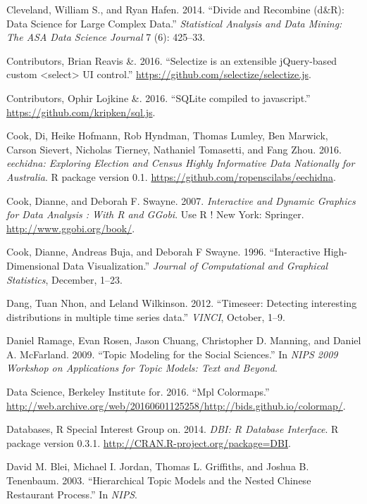 \documentclass[12pt,]{isuthesis}
\begin{document}
\hypertarget{ref-divide-recombine}{}
Cleveland, William S., and Ryan Hafen. 2014. ``Divide and Recombine
(d\&R): Data Science for Large Complex Data.'' \emph{Statistical
Analysis and Data Mining: The ASA Data Science Journal} 7 (6): 425--33.

\hypertarget{ref-selectizejs}{}
Contributors, Brian Reavis \&. 2016. ``Selectize is an extensible
jQuery-based custom \textless{}select\textgreater{} UI control.''
\url{https://github.com/selectize/selectize.js}.

\hypertarget{ref-SQLjs}{}
Contributors, Ophir Lojkine \&. 2016. ``SQLite compiled to javascript.''
\url{https://github.com/kripken/sql.js}.

\hypertarget{ref-eechidna}{}
Cook, Di, Heike Hofmann, Rob Hyndman, Thomas Lumley, Ben Marwick, Carson
Sievert, Nicholas Tierney, Nathaniel Tomasetti, and Fang Zhou. 2016.
\emph{eechidna: Exploring Election and Census Highly Informative Data
Nationally for Australia}. R package version 0.1.
\url{https://github.com/ropenscilabs/eechidna}.

\hypertarget{ref-ggobi:2007}{}
Cook, Dianne, and Deborah F. Swayne. 2007. \emph{Interactive and Dynamic
Graphics for Data Analysis : With R and GGobi}. Use R ! New York:
Springer. \url{http://www.ggobi.org/book/}.

\hypertarget{ref-Cook:2007uk}{}
Cook, Dianne, Andreas Buja, and Deborah F Swayne. 1996. ``Interactive
High-Dimensional Data Visualization.'' \emph{Journal of Computational
and Graphical Statistics}, December, 1--23.

\hypertarget{ref-Wilkinson:2012}{}
Dang, Tuan Nhon, and Leland Wilkinson. 2012. ``Timeseer: Detecting
interesting distributions in multiple time series data.'' \emph{VINCI},
October, 1--9.

\hypertarget{ref-Ramage}{}
Daniel Ramage, Evan Rosen, Jason Chuang, Christopher D. Manning, and
Daniel A. McFarland. 2009. ``Topic Modeling for the Social Sciences.''
In \emph{NIPS 2009 Workshop on Applications for Topic Models: Text and
Beyond}.

\hypertarget{ref-viridis}{}
Data Science, Berkeley Institute for. 2016. ``Mpl Colormaps.''
\url{http://web.archive.org/web/20160601125258/http://bids.github.io/colormap/}.

\hypertarget{ref-DBI}{}
Databases, R Special Interest Group on. 2014. \emph{DBI: R Database
Interface}. R package version 0.3.1.
\url{http://CRAN.R-project.org/package=DBI}.

\hypertarget{ref-Blei-hierarchical}{}
David M. Blei, Michael I. Jordan, Thomas L. Griffiths, and Joshua B.
Tenenbaum. 2003. ``Hierarchical Topic Models and the Nested Chinese
Restaurant Process.'' In \emph{NIPS}.
\end{document}

